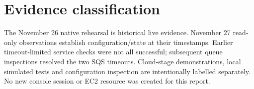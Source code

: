 \section{Evidence classification}
The November 26 native rehearsal is historical live evidence. November 27 read-only observations establish configuration/state at their timestamps. Earlier timeout-limited service checks were not all successful; subsequent queue inspections resolved the two SQS timeouts. Cloud-stage demonstrations, local simulated tests and configuration inspection are intentionally labelled separately. No new console session or EC2 resource was created for this report.
\FloatBarrier
